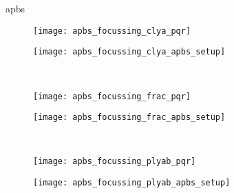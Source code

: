 \gls{apbs}

\begin{figure*}[t]
  \centering
  \medskip
  \begin{minipage}[t]{120mm}
    \centering
    \begin{subfigure}[t]{50mm}
      \centering
      \caption{}\vspace{-5mm}\hspace{1.5mm}\label{fig:apbs_focussing_clya_pqr}
      \texttt{[image: apbs\_focussing\_clya\_pqr]}
    \end{subfigure}
    \hspace{2mm}
    \begin{subfigure}[t]{55mm}
      \centering
      \caption{}\vspace{-5mm}\hspace{1.5mm}\label{fig:apbs_focussing_clya_apbs_setup}
      \texttt{[image: apbs\_focussing\_clya\_apbs\_setup]}
    \end{subfigure}
  \end{minipage}
  \\ \vspace{4mm}
  \begin{minipage}[t]{120mm}
    \centering
    \begin{subfigure}[t]{50mm}
      \centering
      \caption{}\vspace{-5mm}\hspace{1.5mm}\label{fig:apbs_focussing_frac_pqr}
      \texttt{[image: apbs\_focussing\_frac\_pqr]}
    \end{subfigure}
    \hspace{2mm}
    \begin{subfigure}[t]{55mm}
      \centering
      \caption{}\vspace{-5mm}\hspace{1.5mm}\label{fig:apbs_focussing_frac_apbs_setup}
      \texttt{[image: apbs\_focussing\_frac\_apbs\_setup]}
    \end{subfigure}
  \end{minipage}
  \\ \vspace{4mm}
  \begin{minipage}[t]{120mm}
    \centering
    \begin{subfigure}[t]{50mm}
      \centering
      \caption{}\vspace{-5mm}\hspace{1.5mm}\label{fig:apbs_focussing_plyab_pqr}
      \texttt{[image: apbs\_focussing\_plyab\_pqr]}
    \end{subfigure}
    \hspace{2mm}
    \begin{subfigure}[t]{55mm}
      \centering
      \caption{}\vspace{-5mm}\hspace{1.5mm}\label{fig:apbs_focussing_plyab_apbs_setup}
      \texttt{[image: apbs\_focussing\_plyab\_apbs\_setup]}
    \end{subfigure}
  \end{minipage}


\end{figure*}
